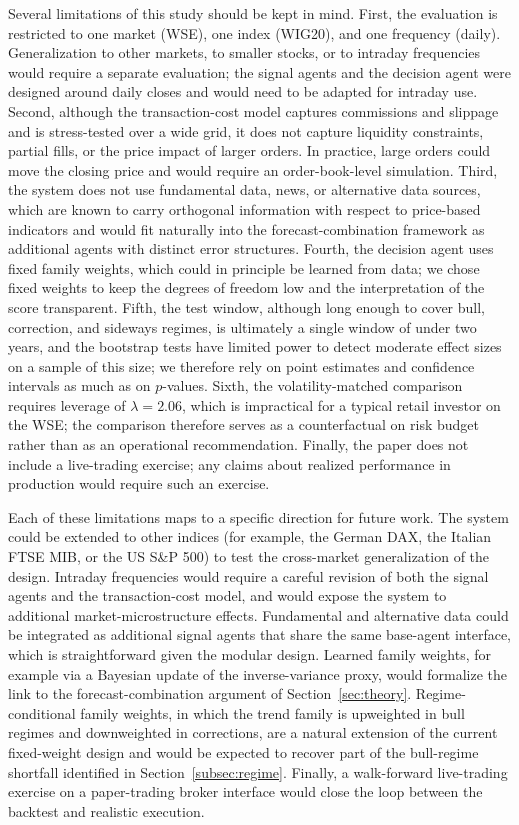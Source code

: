 \documentclass{ieeeaccess}
\newcommand{\Leverage}{\ensuremath{2.06}}
\begin{document}
Several limitations of this study should be kept in mind. First, the evaluation is restricted to one market (WSE), one index (WIG20), and one frequency (daily). Generalization to other markets, to smaller stocks, or to intraday frequencies would require a separate evaluation; the signal agents and the decision agent were designed around daily closes and would need to be adapted for intraday use. Second, although the transaction-cost model captures commissions and slippage and is stress-tested over a wide grid, it does not capture liquidity constraints, partial fills, or the price impact of larger orders. In practice, large orders could move the closing price and would require an order-book-level simulation. Third, the system does not use fundamental data, news, or alternative data sources, which are known to carry orthogonal information with respect to price-based indicators and would fit naturally into the forecast-combination framework as additional agents with distinct error structures. Fourth, the decision agent uses fixed family weights, which could in principle be learned from data; we chose fixed weights to keep the degrees of freedom low and the interpretation of the score transparent. Fifth, the test window, although long enough to cover bull, correction, and sideways regimes, is ultimately a single window of under two years, and the bootstrap tests have limited power to detect moderate effect sizes on a sample of this size; we therefore rely on point estimates and confidence intervals as much as on $p$-values. Sixth, the volatility-matched comparison requires leverage of $\lambda = \Leverage{}$, which is impractical for a typical retail investor on the WSE; the comparison therefore serves as a counterfactual on risk budget rather than as an operational recommendation. Finally, the paper does not include a live-trading exercise; any claims about realized performance in production would require such an exercise.

Each of these limitations maps to a specific direction for future work. The system could be extended to other indices (for example, the German DAX, the Italian FTSE MIB, or the US S\&P 500) to test the cross-market generalization of the design. Intraday frequencies would require a careful revision of both the signal agents and the transaction-cost model, and would expose the system to additional market-microstructure effects. Fundamental and alternative data could be integrated as additional signal agents that share the same base-agent interface, which is straightforward given the modular design. Learned family weights, for example via a Bayesian update of the inverse-variance proxy, would formalize the link to the forecast-combination argument of Section~\ref{sec:theory}. Regime-conditional family weights, in which the trend family is upweighted in bull regimes and downweighted in corrections, are a natural extension of the current fixed-weight design and would be expected to recover part of the bull-regime shortfall identified in Section~\ref{subsec:regime}. Finally, a walk-forward live-trading exercise on a paper-trading broker interface would close the loop between the backtest and realistic execution.
\end{document}
